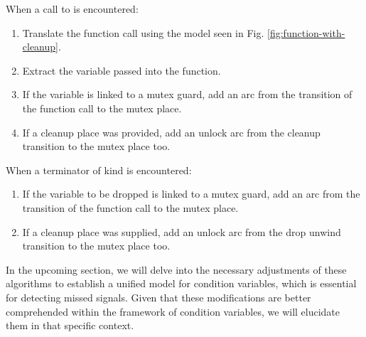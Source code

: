 When a call to  is encountered:

\begin{enumerate}
  \item Translate the function call using the model seen in Fig. \ref{fig:function-with-cleanup}.
  \item Extract the variable passed into the function.
  \item If the variable is linked to a mutex guard,
        add an arc from the transition of the function call to the mutex place.
  \item If a cleanup place was provided,
        add an unlock arc from the cleanup transition to the mutex place too.
\end{enumerate}

When a terminator of kind  is encountered:

\begin{enumerate}
  \item If the variable to be dropped is linked to a mutex guard,
        add an arc from the transition of the function call to the mutex place.
  \item If a cleanup place was supplied,
        add an unlock arc from the drop unwind transition to the mutex place too.
\end{enumerate}

In the upcoming section,
we will delve into the necessary adjustments of these algorithms to
establish a unified model for condition variables,
which is essential for detecting missed signals.
Given that these modifications are better comprehended
within the framework of condition variables,
we will elucidate them in that specific context.